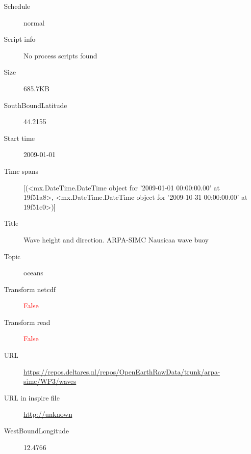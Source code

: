 \documentclass[9]{report}
\begin{document}
\begin{description}
\begin{verbatim}
\end{verbatim}
  \item[Schedule] normal
  \item[Script info] No process scripts found
  \item[Size] 685.7KB
  \item[SouthBoundLatitude] 44.2155
  \item[Start time] 2009-01-01
  \item[Time spans] [(<mx.DateTime.DateTime object for '2009-01-01 00:00:00.00' at 19f51a8>, <mx.DateTime.DateTime object for '2009-10-31 00:00:00.00' at 19f51e0>)]
  \item[Title]  Wave height and direction. ARPA-SIMC Nausicaa wave buoy 
  \item[Topic] oceans
  \item[Transform netcdf] \textcolor{red}{False}
  \item[Transform read] \textcolor{red}{False}
  \item[URL] \href{https://repos.deltares.nl/repos/OpenEarthRawData/trunk/arpa-simc/WP3/waves}{https://repos.deltares.nl/repos/OpenEarthRawData/trunk/arpa-simc/WP3/waves}
  \item[URL in inspire file] \href{http://unknown}{http://unknown}
  \item[WestBoundLongitude] 12.4766
\end{description}
\end{document}
